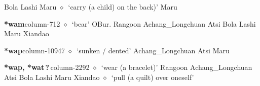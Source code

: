 \hspace{1ex}
         Bola 
\hspace{1ex}
         Lashi 
\hspace{1ex}
         Maru 
\hspace{1ex}
         $\diamond$~`carry (a child) on the back)'
         Maru 
  \item {\footnotesize \textbf{*wam}}{\tiny column-712}
         $\diamond$~`bear'
         OBur. 
\hspace{1ex}
         Rangoon 
\hspace{1ex}
         Achang\_Longchuan 
\hspace{1ex}
         Atsi 
\hspace{1ex}
         Bola 
\hspace{1ex}
         Lashi 
\hspace{1ex}
         Maru 
\hspace{1ex}
         Xiandao 
  \item {\footnotesize \textbf{*wap}}{\tiny column-10947}
         $\diamond$~`sunken / dented'
         Achang\_Longchuan 
\hspace{1ex}
         Atsi 
\hspace{1ex}
         Maru 
  \item {\footnotesize \textbf{*wap, *wat\,?\,}}{\tiny column-2292}
         $\diamond$~`wear (a bracelet)'
         Rangoon 
\hspace{1ex}
         Achang\_Longchuan 
\hspace{1ex}
         Atsi 
\hspace{1ex}
         Bola 
\hspace{1ex}
         Lashi 
\hspace{1ex}
         Maru 
\hspace{1ex}
         Xiandao 
\hspace{1ex}
         $\diamond$~`pull (a quilt) over oneself'
